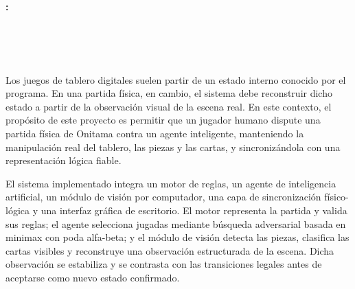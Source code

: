 \chapter*{}






\cleardoublepage
\thispagestyle{empty}

\begin{center}
{\large\bfseries \myTitle: \mySubTitle}\\
\end{center}

\begin{center}
\myName\\
\end{center}

\\

\vspace{0.7cm}
\\

Los juegos de tablero digitales suelen partir de un estado interno conocido por el programa. En una partida física, en cambio, el sistema debe reconstruir dicho estado a partir de la observación visual de la escena real. En este contexto, el propósito de este proyecto es permitir que un jugador humano dispute una partida física de Onitama contra un agente inteligente, manteniendo la manipulación real del tablero, las piezas y las cartas, y sincronizándola con una representación lógica fiable.

El sistema implementado integra un motor de reglas, un agente de inteligencia artificial, un módulo de visión por computador, una capa de sincronización físico-lógica y una interfaz gráfica de escritorio. El motor representa la partida y valida sus reglas; el agente selecciona jugadas mediante búsqueda adversarial basada en minimax con poda alfa-beta; y el módulo de visión detecta las piezas, clasifica las cartas visibles y reconstruye una observación estructurada de la escena. Dicha observación se estabiliza y se contrasta con las transiciones legales antes de aceptarse como nuevo estado confirmado.

